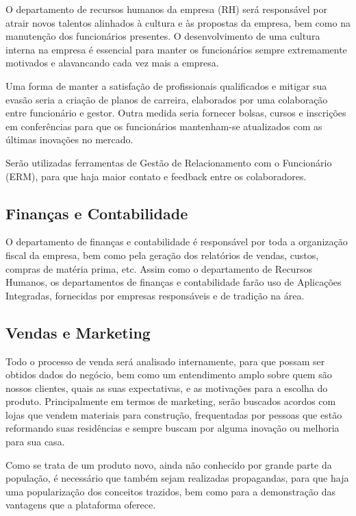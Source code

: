 O departamento de recursos humanos da empresa (RH) será responsável por atrair novos talentos alinhados à cultura e às propostas da empresa, bem como na manutenção dos funcionários presentes. O desenvolvimento de uma cultura interna na empresa é essencial para manter os funcionários sempre extremamente motivados e alavancando cada vez mais a empresa.

Uma forma de manter a satisfação de profissionais qualificados e mitigar sua evasão seria a criação de planos de carreira, elaborados por uma colaboração entre funcionário e gestor. Outra medida seria fornecer bolsas, cursos e inscrições em conferências para que os funcionários mantenham-se atualizados com as últimas inovações no mercado.

Serão utilizadas ferramentas de Gestão de Relacionamento com o Funcionário (ERM), para que haja maior contato e feedback entre os colaboradores.

\subsection{Finanças e Contabilidade}

O departamento de finanças e contabilidade é responsável por toda a organização fiscal da empresa, bem como pela geração dos relatórios de vendas, custos, compras de matéria prima, etc. Assim como o departamento de Recursos Humanos, os departamentos de finanças e contabilidade farão uso de Aplicações Integradas, fornecidas por empresas responsáveis e de tradição na área.

\subsection{Vendas e Marketing}

Todo o processo de venda será analisado internamente, para que possam ser obtidos dados do negócio, bem como um entendimento amplo sobre quem são nossos clientes, quais as suas expectativas, e as motivações para a escolha do produto. Principalmente em termos de marketing, serão buscados acordos com lojas que vendem materiais para construção, frequentadas por pessoas que estão reformando suas residências e sempre buscam por alguma inovação ou melhoria para sua casa.

Como se trata de um produto novo, ainda não conhecido por grande parte da população, é necessário que também sejam realizadas propagandas, para que haja uma popularização dos conceitos trazidos, bem como para a demonstração das vantagens que a plataforma oferece.

